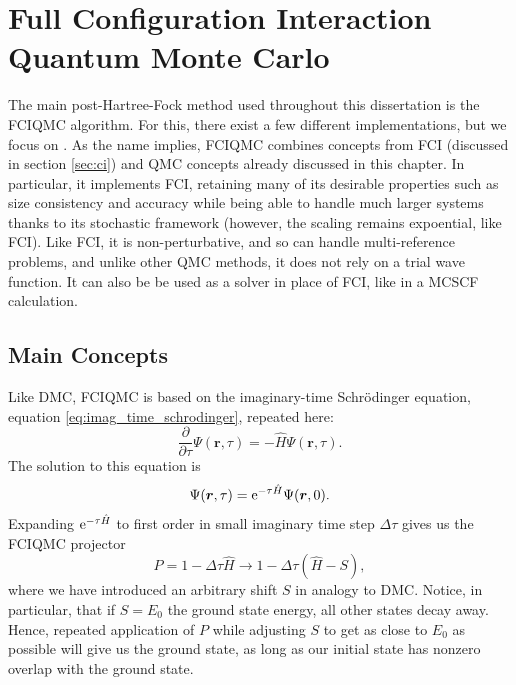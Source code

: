 \section{Full Configuration Interaction Quantum Monte Carlo}
\label{sec:fciqmc}

The main post-Hartree-Fock method used throughout this dissertation is the \gls{FCIQMC} algorithm.\supercite{booth_fciqmc_2009} For this, there exist a few different implementations,\cite{Guther_neci_2020,spencerHANDEQMC2019b,brandRimujl2024,andersonRobertanderson2024} but we focus on \neci.\cite{Guther_neci_2020} As the name implies, \gls{FCIQMC} combines concepts from \gls{FCI} (discussed in section \ref{sec:ci}) and \gls{QMC} concepts already discussed in this chapter. In particular, it implements FCI, retaining many of its desirable properties such as size consistency and accuracy while being able to handle much larger systems thanks to its stochastic framework (however, the scaling remains expoential, like FCI). Like FCI, it is non-perturbative, and so can handle multi-reference problems, and unlike other QMC methods, it does not rely on a trial wave function. It can also be be used as a solver in place of FCI, like in a \gls{MCSCF} calculation.\supercite{dobrautzSpinPure2021,weserStochastic2022}

\subsection{Main Concepts}

Like \gls{DMC}, \gls{FCIQMC} is based on the imaginary-time Schr\"odinger equation, equation \ref{eq:imag_time_schrodinger}, repeated here:
\begin{equation}
    \frac{\partial}{\partial\tau}\Psi(\bm r, \tau) = -\hat H\Psi(\bm r, \tau).
\end{equation}
The solution to this equation is
\begin{equation}
    \Psi(\bm r, \tau) = \mathrm{e}^{-\tau\hat H}\Psi(\bm r, 0).
\end{equation}
Expanding $\mathrm{e}^{-\tau\hat H}$ to first order in small imaginary time step $\Delta\tau$ gives us the FCIQMC projector
\begin{equation}
    \label{eq:fciqmc_projector}
    P = 1-\Delta\tau\hat H \to 1-\Delta\tau(\hat H - S),
\end{equation}
where we have introduced an arbitrary shift $S$ in analogy to \gls{DMC}. Notice, in particular, that if $S=E_0$ the ground state energy, all other states decay away. Hence, repeated application of $P$ while adjusting $S$ to get as close to $E_0$ as possible will give us the ground state, as long as our initial state has nonzero overlap with the ground state.

